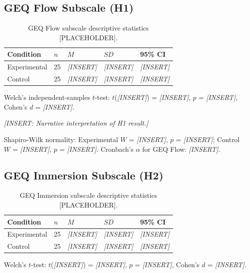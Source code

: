 \documentclass[12pt,a4paper]{report}
\begin{document}
\subsection{GEQ Flow Subscale (H1)}

\begin{table}[H]
\centering
\caption{GEQ Flow subscale descriptive statistics [PLACEHOLDER].}
\label{tab:geq_flow}
\small
\begin{tabular}{@{}lllll@{}}
\toprule
\textbf{Condition} & $n$ & $M$ & $SD$ & \textbf{95\% CI} \\
\midrule
Experimental & 25 & \textit{[INSERT]} & \textit{[INSERT]} & \textit{[INSERT]} \\
Control & 25 & \textit{[INSERT]} & \textit{[INSERT]} & \textit{[INSERT]} \\
\bottomrule
\end{tabular}
\end{table}

Welch's independent-samples $t$-test: $t$(\textit{[INSERT]}) = \textit{[INSERT]}, $p$ = \textit{[INSERT]}, Cohen's $d$ = \textit{[INSERT]}.

\textit{[INSERT: Narrative interpretation of H1 result.]}

Shapiro-Wilk normality: Experimental $W$ = \textit{[INSERT]}, $p$ = \textit{[INSERT]}; Control $W$ = \textit{[INSERT]}, $p$ = \textit{[INSERT]}. Cronbach's $\alpha$ for GEQ Flow: \textit{[INSERT]}.

\subsection{GEQ Immersion Subscale (H2)}

\begin{table}[H]
\centering
\caption{GEQ Immersion subscale descriptive statistics [PLACEHOLDER].}
\label{tab:geq_immersion}
\small
\begin{tabular}{@{}lllll@{}}
\toprule
\textbf{Condition} & $n$ & $M$ & $SD$ & \textbf{95\% CI} \\
\midrule
Experimental & 25 & \textit{[INSERT]} & \textit{[INSERT]} & \textit{[INSERT]} \\
Control & 25 & \textit{[INSERT]} & \textit{[INSERT]} & \textit{[INSERT]} \\
\bottomrule
\end{tabular}
\end{table}

Welch's $t$-test: $t$(\textit{[INSERT]}) = \textit{[INSERT]}, $p$ = \textit{[INSERT]}, Cohen's $d$ = \textit{[INSERT]}.
\end{document}
